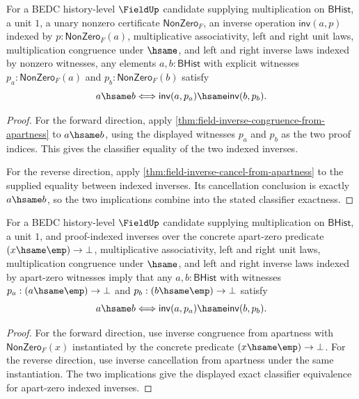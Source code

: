 \begin{theorem}
\label{thm:field-inverse-classifier-exact-from-apartness}
For a BEDC history-level $\FieldUp$ candidate supplying multiplication on
$\mathsf{BHist}$, a unit $1$, a unary nonzero certificate
$\mathsf{NonZero}_F$, an inverse operation $\mathsf{inv}(a,p)$ indexed by
$p:\mathsf{NonZero}_F(a)$, multiplicative associativity, left and right unit
laws, multiplication congruence under $\hsame$, and left and right inverse
laws indexed by nonzero witnesses, any elements $a,b:\mathsf{BHist}$ with
explicit witnesses $p_a:\mathsf{NonZero}_F(a)$ and
$p_b:\mathsf{NonZero}_F(b)$ satisfy
$$
a\hsame b \Longleftrightarrow
\mathsf{inv}(a,p_a)\hsame\mathsf{inv}(b,p_b).
$$
\end{theorem}
\begin{proof}
For the forward direction, apply
\autoref{thm:field-inverse-congruence-from-apartness} to $a\hsame b$, using
the displayed witnesses $p_a$ and $p_b$ as the two proof indices. This gives
the classifier equality of the two indexed inverses.

For the reverse direction, apply
\autoref{thm:field-inverse-cancel-from-apartness} to the supplied equality
between indexed inverses. Its cancellation conclusion is exactly $a\hsame b$,
so the two implications combine into the stated classifier exactness.
\end{proof}

\begin{theorem}
\label{thm:field-apart-zero-inverse-classifier-exact-from-apartness}
For a BEDC history-level $\FieldUp$ candidate supplying multiplication on
$\mathsf{BHist}$, a unit $1$, and proof-indexed inverses over the concrete
apart-zero predicate $(x\hsame\emp)\to\bot$, multiplicative associativity,
left and right unit laws, multiplication congruence under $\hsame$, and left
and right inverse laws indexed by apart-zero witnesses imply that any
$a,b:\mathsf{BHist}$ with witnesses
$p_a:(a\hsame\emp)\to\bot$ and $p_b:(b\hsame\emp)\to\bot$ satisfy
$$
a\hsame b \Longleftrightarrow
\mathsf{inv}(a,p_a)\hsame\mathsf{inv}(b,p_b).
$$
\end{theorem}
\begin{proof}
For the forward direction, use inverse congruence from apartness with
$\mathsf{NonZero}_F(x)$ instantiated by the concrete predicate
$(x\hsame\emp)\to\bot$. For the reverse direction, use inverse cancellation
from apartness under the same instantiation. The two implications give the
displayed exact classifier equivalence for apart-zero indexed inverses.
\end{proof}

